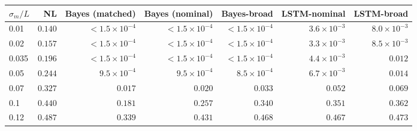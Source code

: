 \begin{tabular}{lrrrrrr}
\toprule
$\sigma_m/L$ & NL & Bayes (matched) & Bayes (nominal) & Bayes-broad & LSTM-nominal & LSTM-broad \\
\midrule
0.01 & $0.140$ & $<1.5\!\times\!10^{-4}$ & $<1.5\!\times\!10^{-4}$ & \textit{$<1.5\!\times\!10^{-4}$} & $3.6\!\times\!10^{-3}$ & \textit{$8.0\!\times\!10^{-3}$} \\
0.02 & $0.157$ & $<1.5\!\times\!10^{-4}$ & $<1.5\!\times\!10^{-4}$ & $<1.5\!\times\!10^{-4}$ & $3.3\!\times\!10^{-3}$ & $8.5\!\times\!10^{-3}$ \\
0.035 & $0.196$ & $<1.5\!\times\!10^{-4}$ & $<1.5\!\times\!10^{-4}$ & $<1.5\!\times\!10^{-4}$ & $4.4\!\times\!10^{-3}$ & $0.012$ \\
0.05 & $0.244$ & $9.5\!\times\!10^{-4}$ & $9.5\!\times\!10^{-4}$ & $8.5\!\times\!10^{-4}$ & $6.7\!\times\!10^{-3}$ & $0.014$ \\
0.07 & $0.327$ & $0.017$ & $0.020$ & $0.033$ & $0.052$ & $0.069$ \\
0.1 & $0.440$ & $0.181$ & $0.257$ & \textit{$0.340$} & $0.351$ & \textit{$0.362$} \\
0.12 & $0.487$ & $0.339$ & $0.431$ & \textit{$0.468$} & $0.467$ & \textit{$0.473$} \\
\bottomrule
\end{tabular}